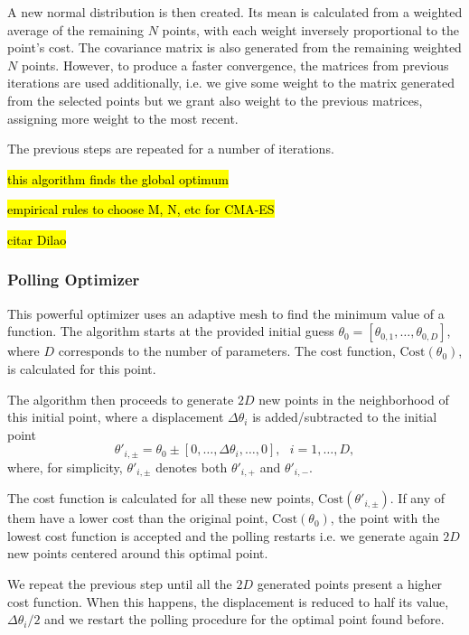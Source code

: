 A new normal distribution is then created. Its mean is calculated from a weighted average of the remaining $N$ points, with each weight inversely proportional to the point's cost. The covariance matrix is also generated from the remaining weighted $N$ points. However, to produce a faster convergence, the matrices from previous iterations are used additionally, i.e. we give some weight to the matrix generated from the selected points but we grant also weight to the previous matrices, assigning more weight to the most recent.

The previous steps are repeated for a number of iterations.

\hl{this algorithm finds the global optimum}

\hl{empirical rules to choose M, N, etc for CMA-ES}


\hl{citar Dilao} \cite{DilaoCMA}





\iffalse
\subsubsection{Polling Optimizer}
This powerful optimizer uses an adaptive mesh to find the minimum value of a function.
The algorithm starts at the provided initial guess $\theta_0=\left[\theta_{0,1},\ldots,\theta_{0,D}\right]$, where $D$ corresponds to the number of parameters. The cost function, $\mathrm{Cost}(\theta_0)$, is calculated for this point.

The algorithm then proceeds to generate $2D$ new points in the neighborhood of this initial point, where a displacement $\Delta\theta_i$ is added/subtracted to the initial point
\begin{equation}
\theta'_{i,\pm}=\theta_0\pm\left[0,\ldots,\Delta\theta_i,\ldots,0\right],\ \ \ i=1,\ldots,D,
\end{equation}
\noindent where, for simplicity, $\theta'_{i,\pm}$ denotes both $\theta'_{i,+}$ and $\theta'_{i,-}$.

The cost function is calculated for all these new points, $\mathrm{Cost}(\theta'_{i,\pm})$. If any of them have a lower cost than the original point, $\mathrm{Cost}(\theta_0)$, the point with the lowest cost function is accepted and the polling restarts i.e. we generate again $2D$ new points centered around this optimal point.

We repeat the previous step until all the $2D$ generated points present a higher cost function. When this happens, the displacement is reduced to half its value, $\Delta\theta_i/2$ and we restart the polling procedure for the optimal point found before.

